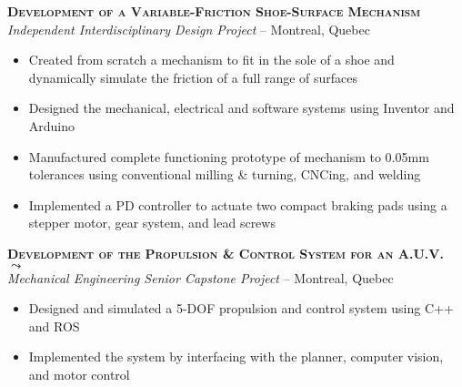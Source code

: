 \documentclass[11pt, letterpaper]{article}
\newcommand{\years}[1]{\marginnote{\footnotesize #1}} %
\begin{document}
  \begin{samepage}
    \years{9/2013 - 7/2014} \textbf{\scshape Development of a Variable-Friction Shoe-Surface Mechanism}\\
    {\textit{Independent Interdisciplinary Design Project}} -- Montreal, Quebec
    \begin{itemize}
      \item Created from scratch a mechanism to fit in the sole of a shoe and dynamically simulate the friction of a full range of surfaces %
      \item Designed the mechanical, electrical and software systems using Inventor and Arduino
      \item Manufactured complete functioning prototype of mechanism to 0.05mm tolerances using conventional milling \& turning, CNCing, and welding
      \item Implemented a PD controller to actuate two compact braking pads using a stepper motor, gear system, and lead screws
    \end{itemize}
  \end{samepage}

  \begin{samepage}
    \years{9/2013 - 5/2014} \textbf{\scshape Development of the Propulsion \& Control System for an A.U.V. \href{http://www.michaelelliotking.com/projects/controls}{$\leadsto$}}\\
    {\textit{Mechanical Engineering Senior Capstone Project}} -- Montreal, Quebec
    \begin{itemize}
      \item Designed and simulated a 5-DOF propulsion and control system using C++ and ROS
      \item Implemented the system by interfacing with the planner, computer vision, and motor control
    \end{itemize}
  \end{samepage}
\end{document}
